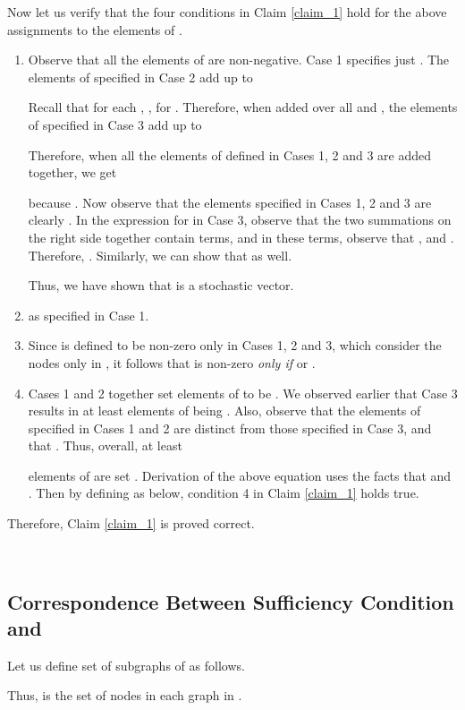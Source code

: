 \documentclass[letterpaper, 12pt]{article}
\begin{document}
Now let us verify that the four conditions in Claim \ref{claim_1} hold
for the above assignments to the elements of .
\begin{enumerate}
\item
Observe that all the elements of  are non-negative.
Case 1 specifies just .
The elements of  specified in Case 2 
add up to

Recall that for each , ,
 for .
Therefore, when added over all 
and , the elements of  specified in Case 3 
add up to

Therefore, when all the elements of  defined in Cases 1,
2 and 3 are added together, we get

because 
.
Now observe that the elements specified in Cases 1, 2 and 3 are clearly
.
In the expression for  in Case 3, observe that the two
summations on the right side together contain  terms,
and in these terms, observe that ,
 and . Therefore,
.
Similarly, we can show that  as well.

Thus, we have shown that  is a stochastic vector.

\item  as specified in Case 1.

\item Since  is defined to be non-zero only in Cases 1, 2 and 3,
which consider the nodes only in , it follows
that  is non-zero {\em only if} 
or .

\item
Cases 1 and 2 together set 
elements of  to be . We observed
earlier that Case 3 results in at least
 elements of  
being .
Also, observe that the elements of  specified
in Cases 1 and 2 are distinct from those specified in Case 3,
and that . Thus, overall, at
least

elements of  are set
.
Derivation of the above equation uses the facts that
 and
. Then
by defining  as below, condition 4 in Claim \ref{claim_1}
holds true.

\end{enumerate}

Therefore, Claim \ref{claim_1} is proved correct.

~


\subsection{Correspondence Between Sufficiency Condition and }

Let us define set  of subgraphs of  as follows.

Thus,  is the set of nodes in each graph in .
\end{document}
